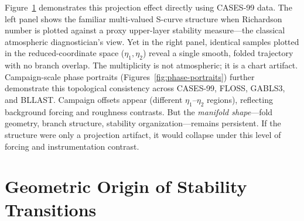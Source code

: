 \documentclass[12pt,a4paper]{article}
\begin{document}
\begin{figure}[t]
\label{fig:projection-artifact}
\centering
{}
\end{figure}

Figure~\ref{fig:projection-artifact} demonstrates this projection effect directly using CASES-99 data. The left panel shows the familiar multi-valued S-curve structure when Richardson number is plotted against a proxy upper-layer stability measure---the classical atmospheric diagnostician's view. Yet in the right panel, identical samples plotted in the reduced-coordinate space ($\eta_1, \eta_2$) reveal a single smooth, folded trajectory with no branch overlap. The multiplicity is not atmospheric; it is a chart artifact. Campaign-scale phase portraits (Figures~\ref{fig:phase-portraits}) further demonstrate this topological consistency across CASES-99, FLOSS, GABLS3, and BLLAST. Campaign offsets appear (different $\eta_1$--$\eta_2$ regions), reflecting background forcing and roughness contrasts. But the \emph{manifold shape}---fold geometry, branch structure, stability organization---remains persistent. If the structure were only a projection artifact, it would collapse under this level of forcing and instrumentation contrast.

\section{Geometric Origin of Stability Transitions}
\end{document}
